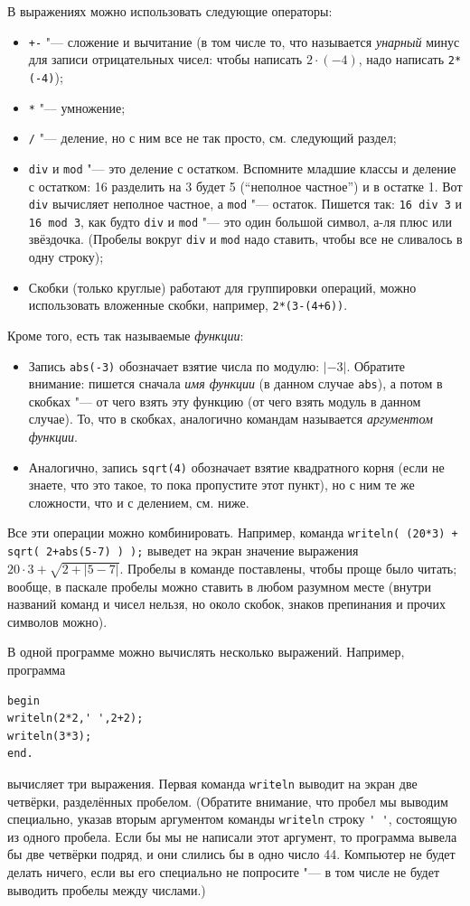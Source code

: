 В выражениях можно использовать следующие операторы:
\begin{itemize}
\item \verb`+-` "--- сложение и вычитание (в том числе то, что называется \textit{унарный} минус для записи отрицательных чисел: чтобы написать $2\cdot(-4)$, надо написать \verb`2*(-4)`);
\item \verb`*` "--- умножение;
\item \verb`/` "--- деление, но с ним все не так просто, см. следующий раздел;
\item \verb`div` и \verb`mod` "--- это деление с остатком. Вспомните младшие классы и деление с остатком: 16 разделить на 3 будет 5 (``неполное частное'') и в остатке 1. Вот \verb`div` вычисляет неполное частное, а \verb`mod` "--- остаток. Пишется так: \verb`16 div 3` и \verb`16 mod 3`, как будто \verb`div` и \verb`mod` "--- это один большой символ, а-ля плюс или звёздочка. (Пробелы вокруг \verb`div` и \verb`mod` надо ставить, чтобы все не сливалось в одну строку);
\item Скобки (только круглые) работают для группировки операций, можно использовать вложенные скобки, например, \verb`2*(3-(4+6))`.
\end{itemize}

Кроме того, есть так называемые \textit{функции}:
\begin{itemize}
\item Запись \verb`abs(-3)` обозначает взятие числа по модулю: $|-3|$. Обратите внимание: пишется сначала \textit{имя функции} (в данном случае \verb`abs`), а потом в скобках "--- от чего взять эту функцию (от чего взять модуль в данном случае). То, что в скобках, аналогично командам называется \textit{аргументом функции}.
\item Аналогично, запись \verb`sqrt(4)` обозначает взятие квадратного корня (если не знаете, что это такое, то пока пропустите этот пункт), но с ним те же сложности, что и с делением, см. ниже.
\end{itemize}

Все эти операции можно комбинировать. Например, команда \verb`writeln( (20*3) + sqrt( 2+abs(5-7) ) );` выведет на экран значение выражения $20\cdot 3 + \sqrt{2+|5-7|}$. Пробелы в команде поставлены, чтобы проще было читать; вообще, в паскале пробелы можно ставить в любом разумном месте (внутри названий команд и чисел нельзя, но около скобок, знаков препинания и прочих символов можно).

В одной программе можно вычислять несколько выражений. Например, программа
\begin{verbatim}
begin
writeln(2*2,' ',2+2);
writeln(3*3);
end.
\end{verbatim}
вычисляет три выражения. Первая команда \verb`writeln` выводит на экран две четвёрки, разделённых 
пробелом. (Обратите внимание, что пробел мы выводим специально, указав вторым аргументом команды 
\verb`writeln` строку \verb`' '`, состоящую из одного пробела. Если бы мы не написали этот 
аргумент, то программа вывела бы две четвёрки подряд, и они слились бы в одно число 44. Компьютер 
не будет делать ничего, если вы его специально не попросите "--- в том числе не будет выводить 
пробелы между числами.)

